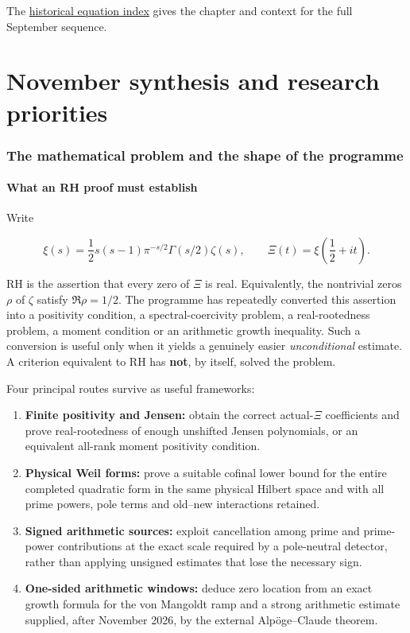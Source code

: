 \documentclass[
  10pt,
  a4paper,
  10pt,
  oneside,
  openany]{book}
\providecommand{\tightlist}{%
  \setlength{\itemsep}{0pt}\setlength{\parskip}{0pt}}
\begin{document}
The \hyperref[app-equations]{historical equation index} gives the
chapter and context for the full September sequence.

\part{November synthesis and research priorities}

\section{The mathematical problem and the shape of the
programme}\label{the-mathematical-problem-and-the-shape-of-the-programme}

\subsection{What an RH proof must
establish}\label{what-an-rh-proof-must-establish}

Write

\[
\xi(s)=\frac12s(s-1)\pi^{-s/2}\Gamma(s/2)\zeta(s),
\qquad \Xi(t)=\xi\left(\frac12+it\right).
\tag{S1.1}\label{eq:S1.1}
\]

RH is the assertion that every zero of \(\Xi\) is real. Equivalently,
the nontrivial zeros \(\rho\) of \(\zeta\) satisfy \(\Re\rho=1/2\). The
programme has repeatedly converted this assertion into a positivity
condition, a spectral-coercivity problem, a real-rootedness problem, a
moment condition or an arithmetic growth inequality. Such a conversion
is useful only when it yields a genuinely easier \emph{unconditional}
estimate. A criterion equivalent to RH has \textbf{not}, by itself,
solved the problem.

Four principal routes survive as useful frameworks:

\begin{enumerate}
\def\labelenumi{\arabic{enumi}.}
\tightlist
\item
  \textbf{Finite positivity and Jensen:} obtain the correct
  actual-\(\Xi\) coefficients and prove real-rootedness of enough
  unshifted Jensen polynomials, or an equivalent all-rank moment
  positivity condition.
\item
  \textbf{Physical Weil forms:} prove a suitable cofinal lower bound for
  the entire completed quadratic form in the same physical Hilbert space
  and with all prime powers, pole terms and old--new interactions
  retained.
\item
  \textbf{Signed arithmetic sources:} exploit cancellation among prime
  and prime-power contributions at the exact scale required by a
  pole-neutral detector, rather than applying unsigned estimates that
  lose the necessary sign.
\item
  \textbf{One-sided arithmetic windows:} deduce zero location from an
  exact growth formula for the von Mangoldt ramp and a strong arithmetic
  estimate supplied, after November 2026, by the external Alpöge--Claude
  theorem.
\end{enumerate}
\end{document}
